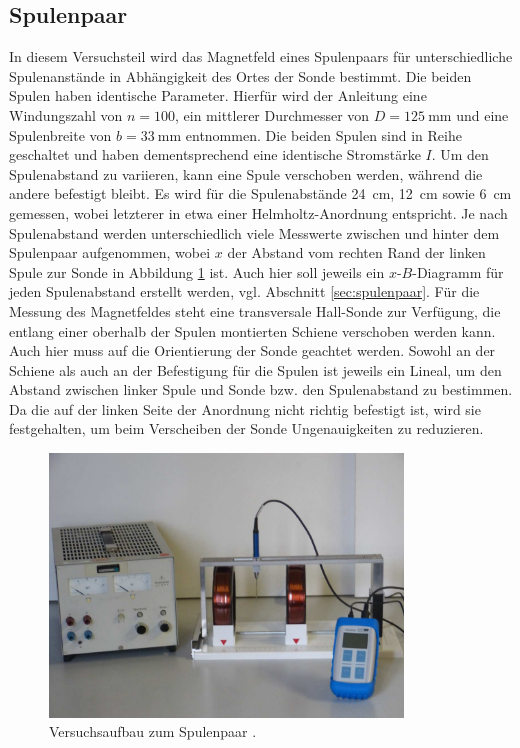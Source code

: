 \subsection{Spulenpaar}
In diesem Versuchsteil wird das Magnetfeld eines Spulenpaars für unterschiedliche Spulenanstände in Abhängigkeit des Ortes der Sonde bestimmt.
Die beiden Spulen haben identische Parameter.
Hierfür wird der Anleitung \cite[]{man:v308} eine Windungszahl von $n = 100$, ein mittlerer Durchmesser von $D = \qty[]{125}{\mm}$ und eine 
Spulenbreite von $b = \qty[]{33}{\mm}$ entnommen.
Die beiden Spulen sind in Reihe geschaltet und haben dementsprechend eine identische Stromstärke $I$.
Um den Spulenabstand zu variieren, kann eine Spule verschoben werden, während die andere befestigt bleibt.
Es wird für die Spulenabstände \qty[]{24}{\cm}, \qty[]{12}{\cm} sowie \qty[]{6}{\cm} gemessen, wobei letzterer in etwa einer Helmholtz-Anordnung entspricht.
Je nach Spulenabstand werden unterschiedlich viele Messwerte zwischen und hinter dem Spulenpaar aufgenommen, wobei $x$ der Abstand vom 
rechten Rand der linken Spule zur Sonde in Abbildung \ref{fig:spulenpaar} ist.
Auch hier soll jeweils ein $x$-$B$-Diagramm für jeden Spulenabstand erstellt werden, vgl. Abschnitt \ref{sec:spulenpaar}.
Für die Messung des Magnetfeldes steht eine transversale Hall-Sonde zur Verfügung, die entlang einer oberhalb der Spulen montierten Schiene verschoben werden kann.
Auch hier muss auf die Orientierung der Sonde geachtet werden.
Sowohl an der Schiene als auch an der Befestigung für die Spulen ist jeweils ein Lineal, um den Abstand zwischen linker Spule und Sonde bzw. den Spulenabstand 
zu bestimmen.
Da die auf der linken Seite der Anordnung nicht richtig befestigt ist, wird sie festgehalten, um beim Verscheiben der Sonde Ungenauigkeiten zu reduzieren.



\begin{figure}[H]
    \centering
    \includegraphics[height = 7cm]{abbildungen/spulenpaar.png}
    \caption{Versuchsaufbau zum Spulenpaar \cite[]{man:v308}.}
    \label{fig:spulenpaar}
\end{figure}
